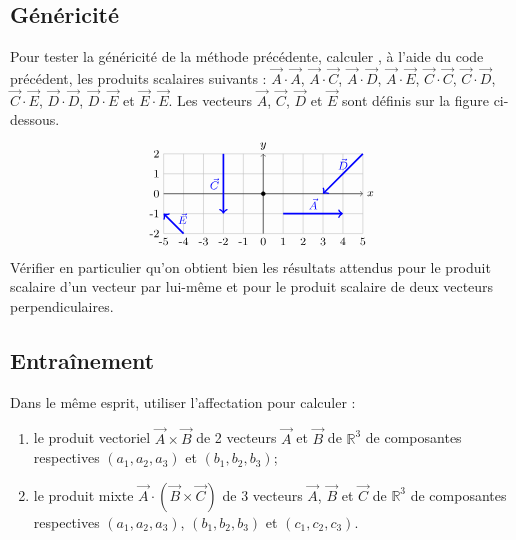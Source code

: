 \subsection{Généricité}\label{affectation:maths:genericite}
Pour tester la généricité de la méthode précédente, 
calculer , à l'aide du code \python{} précédent, les produits scalaires suivants :
$\vec{A}\cdot\vec{A}$, $\vec{A}\cdot\vec{C}$, $\vec{A}\cdot\vec{D}$, $\vec{A}\cdot\vec{E}$,
$\vec{C}\cdot\vec{C}$, $\vec{C}\cdot\vec{D}$, $\vec{C}\cdot\vec{E}$,
$\vec{D}\cdot\vec{D}$, $\vec{D}\cdot\vec{E}$ et $\vec{E}\cdot\vec{E}$.
Les vecteurs $\vec{A}$, $\vec{C}$, $\vec{D}$ et $\vec{E}$ sont 
définis sur la figure ci-dessous.
 $$
\begin{tikzpicture}[scale=0.5]\footnotesize
\draw[color=lightgray](-5,-2) grid[xstep=1,ystep=1] (5,2);
\foreach \x in {-5,-4,...,5} \draw(\x,-2) node[below]{\x};
\foreach \y in {-2,-1,...,2} \draw(-5,\y) node[left]{\y};
\filldraw(0,0) circle (0.1);
\draw[->] (-5,0) -- (5,0);
\draw (5,0) node[right]{$x$} ;
\draw[->] (0,-2) -- (0,2);
\draw (0,2) node[above]{$y$};
\draw[->,very thick,color=blue] (1,-1) -- (4,-1);
\draw[->,very thick,color=blue] (5,2) -- (3,0);
\draw[->,very thick,color=blue] (-2,2) -- (-2,-1);
\draw[->,very thick,color=blue] (-4,-2) -- (-5,-1);
\draw (2.5,-1) node[above,color=blue]{$\vec{A}$};
\draw (-2,0.5) node[left,color=blue]{$\vec{C}$};
\draw (4,1) node[above,color=blue]{$\vec{D}$};
\draw (-4.5,-1.25) node[right,color=blue]{$\vec{E}$};
\end{tikzpicture}
$$
Vérifier en particulier qu'on obtient bien les résultats attendus pour
le produit scalaire d'un vecteur par lui-même et pour le produit scalaire 
de deux vecteurs perpendiculaires.

\subsection{Entraînement}\label{affectation:maths:entrainement} 
Dans le m\^eme esprit, utiliser l'affectation pour calculer :
\begin{enumerate}
\item le produit vectoriel $\vec{A}\times\vec{B}$ de 2 vecteurs $\vec{A}$ et $\vec{B}$
	de $\mathbb{R}^3$ de composantes respectives $(a_1,a_2,a_3)$ et $(b_1,b_2,b_3)$;
\item le produit mixte $\vec{A}\cdot(\vec{B}\times\vec{C})$ de 3 vecteurs $\vec{A}$,
	$\vec{B}$ et $\vec{C}$ de $\mathbb{R}^3$ de composantes respectives $(a_1,a_2,a_3)$, 	
	$(b_1,b_2,b_3)$ et $(c_1,c_2,c_3)$.
\end{enumerate}


